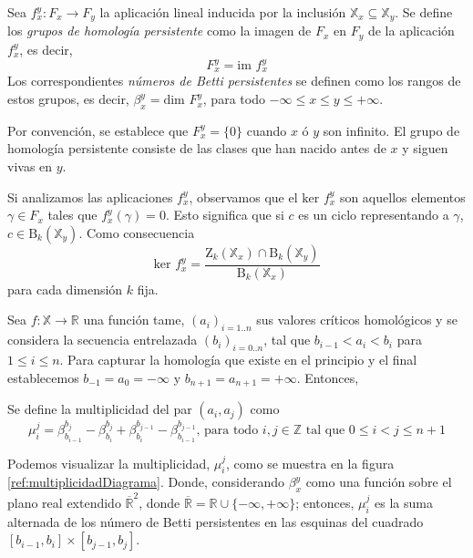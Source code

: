 \begin{definition}
Sea ${f_{x}^{y}: F_x \to F_y}$ la aplicación lineal inducida por la inclusión $\mathbb{X}_{x} \subseteq \mathbb{X}_{y}$. Se define los \emph{grupos de homología persistente} como la imagen de $F_x$ en $F_y$ de la aplicación $f_{x}^{y}$, es decir,
\[
F_{x}^{y} = \text{im } f_{x}^{y}
\]
Los correspondientes \emph{números de Betti persistentes} se definen como los rangos de estos grupos, es decir, $\beta_{x}^{y} = \text{dim } F_{x}^{y}$, para todo $-\infty \leq x \leq y \leq + \infty$. 
\end{definition}
Por convención, se establece que $F_{x}^{y}= \{0\}$ cuando $x$ ó $y$ son infinito. El grupo de homología persistente consiste de las clases que han nacido antes de $x$ y siguen vivas en $y$.


\begin{remark}
Si analizamos las aplicaciones $f_{x}^{y}$, observamos que el $\text{ker } f_{x}^{y}$ son aquellos elementos $\gamma \in F_x$ tales que $f_{x}^{y}(\gamma)=0$. Esto significa que si $c$ es un ciclo representando a $\gamma$, $c \in \text{B}_k(\mathbb{X}_y)$. Como consecuencia
\[
\text{ker } f_{x}^{y} = \dfrac{\text{Z}_k(\mathbb{X}_x) \cap \text{B}_k(\mathbb{X}_y)}{\text{B}_k(\mathbb{X}_x)}
\]
para cada dimensión $k$ fija. 
\end{remark}

Sea $f: \mathbb{X} \to \mathbb{R}$ una función tame, $(a_i)_{i=1..n}$ sus valores críticos homológicos y se considera la secuencia entrelazada $(b_i)_{i=0..n}$, tal que $b_{i-1} < a_{i} < b_{i}$ para $1 \leq i \leq n$. Para capturar la homología que existe en el principio y el final establecemos $b_{-1} = a_0 = -\infty$ y $b_{n+1} = a_{n+1} = +\infty$. Entonces,
\begin{definition}
Se define la multiplicidad del par $(a_i, a_j)$ como
\[
\mu_{i}^{j} = \beta_{b_{i-1}}^{b_j} - \beta_{b_i}^{b_j} +  \beta_{b_i}^{b_{j-1}} - \beta_{b_{i-1}}^{b_{j-1}} \text{, para todo } i, j \in \mathbb{Z} \text{ tal que } 0 \leq i < j \leq n+1
\]
\end{definition}

Podemos visualizar la multiplicidad, $\mu_{i}^{j}$, como se muestra en la figura \ref{ref:multiplicidadDiagrama}. Donde, considerando $\beta_{x}^{y}$ como una función sobre el plano real extendido $\overline{\mathbb{R}}^2$, donde $\overline{\mathbb{R}} = \mathbb{R} \cup \{-\infty, +\infty\}$; entonces, $\mu_{i}^{j}$ es la suma alternada de los número de Betti persistentes en las esquinas del cuadrado $[b_{i-1}, b_i]\times[b_{j-1}, b_j]$.

